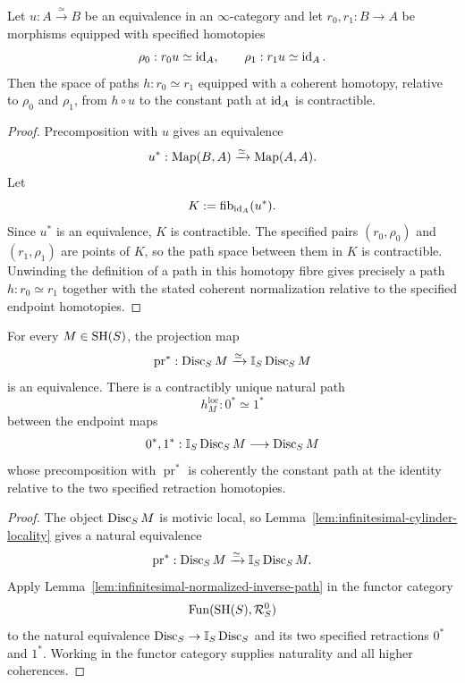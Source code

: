 \begin{lemma}
\label{lem:infinitesimal-normalized-inverse-path}
Let $u:A\xrightarrow{\simeq}B$ be an equivalence in an $\infty$-category and
let $r_0,r_1:B\to A$ be morphisms equipped with specified homotopies
\[
    \rho_0:r_0u\simeq\operatorname{id}_A,
    \qquad
    \rho_1:r_1u\simeq\operatorname{id}_A.
\]
Then the space of paths $h:r_0\simeq r_1$ equipped with a coherent homotopy,
relative to $\rho_0$ and $\rho_1$, from $h\circ u$ to the constant path at
$\operatorname{id}_A$ is contractible.
\end{lemma}

\begin{proof}
Precomposition with $u$ gives an equivalence
\[
    u^*:\operatorname{Map}(B,A)\xrightarrow{\simeq}\operatorname{Map}(A,A).
\]
Let
\[
    K:=\operatorname{fib}_{\operatorname{id}_A}(u^*).
\]
Since $u^*$ is an equivalence, $K$ is contractible.  The specified pairs
$(r_0,\rho_0)$ and $(r_1,\rho_1)$ are points of $K$, so the path space between
them in $K$ is contractible.  Unwinding the definition of a path in this
homotopy fibre gives precisely a path $h:r_0\simeq r_1$ together with the
stated coherent normalization relative to the specified endpoint
homotopies.
\end{proof}

\begin{proposition}
\label{prop:infinitesimal-local-endpoint-path}
For every $M\in\mathrm{SH}(S)$, the projection map
\[
    \operatorname{pr}^*:
    \operatorname{Disc}_SM
    \xrightarrow{\simeq}
    \mathbb I_S\operatorname{Disc}_SM
\]
is an equivalence.  There is a contractibly unique natural path
\[
    h_M^{\mathrm{loc}}:0^*\simeq1^*
\]
between the endpoint maps
\[
    0^*,1^*:
    \mathbb I_S\operatorname{Disc}_SM
    \longrightarrow
    \operatorname{Disc}_SM
\]
whose precomposition with $\operatorname{pr}^*$ is coherently the constant
path at the identity relative to the two specified retraction homotopies.
\end{proposition}

\begin{proof}
The object $\operatorname{Disc}_SM$ is motivic local, so
Lemma~\ref{lem:infinitesimal-cylinder-locality} gives a natural equivalence
\[
    \operatorname{pr}^*:
    \operatorname{Disc}_SM
    \xrightarrow{\simeq}
    \mathbb I_S\operatorname{Disc}_SM.
\]
Apply
Lemma~\ref{lem:infinitesimal-normalized-inverse-path} in the functor category
\[
    \operatorname{Fun}(\mathrm{SH}(S),\mathcal R_S^0)
\]
to the natural equivalence $\operatorname{Disc}_S\to\mathbb I_S\operatorname{Disc}_S$ and its two
specified retractions $0^*$ and $1^*$.  Working in the functor category
supplies naturality and all higher coherences.
\end{proof}

